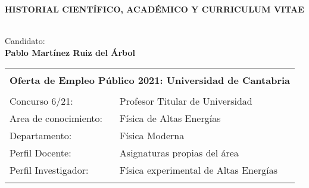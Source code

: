 \thispagestyle{empty}
\newpage
\begin{center}
\baselineskip=1cm {\centerline \bf \huge
\textbf{HISTORIAL CIENTÍFICO, ACADÉMICO Y CURRICULUM VITAE}} \vspace*{2.5cm}\\

\vspace*{2.0cm} \baselineskip=0.5cm
{\Large Candidato:}\\
\vspace*{0.25cm}
{\Large \bf \sc \textbf{Pablo Martínez Ruiz del Árbol}}\\
\vspace*{0.15cm}
\vspace*{2.0cm} \baselineskip=0.75cm
\end{center}


\begin{center}
\begin{tabularx}{\textwidth}{||X X||}
\hline\hline
\multicolumn{2}{||c||}{} \\
\multicolumn{2}{||c||}{\large \textbf{Oferta de Empleo Público 2021: Universidad de Cantabria}} \\
& \\
Concurso 6/21: & Profesor Titular de Universidad \\
Area de conocimiento: & {Física de Altas Energías} \\
Departamento: & {Física Moderna} \\
Perfil Docente: & {Asignaturas propias del área} \\ 
Perfil Investigador: & {Física experimental de Altas Energías} \\
& \\
\hline\hline
\end{tabularx}
\end{center}

\normalsize
